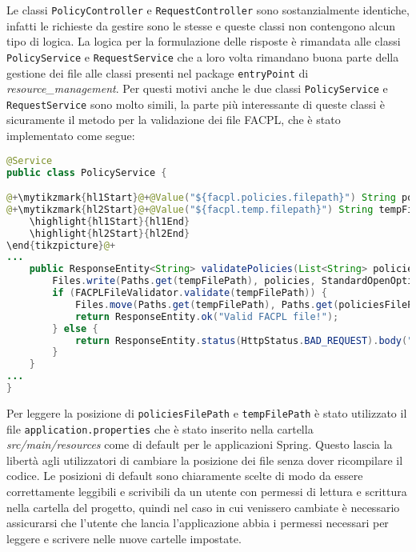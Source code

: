Le classi \texttt{PolicyController} e \texttt{RequestController} sono sostanzialmente identiche, infatti le richieste da gestire sono le stesse e queste classi non contengono alcun tipo di logica. La logica per la formulazione delle risposte è rimandata alle classi \texttt{PolicyService} e \texttt{RequestService} che a loro volta rimandano buona parte della gestione dei file alle classi presenti nel package \texttt{entryPoint} di \emph{resource\_management}.\medbreak
Per questi motivi anche le due classi \texttt{PolicyService} e \texttt{RequestService} sono molto simili, la parte più interessante di queste classi è sicuramente il metodo per la validazione dei file FACPL, che è stato implementato come segue:
\begin{lstlisting}[language=Java, caption=Metodo validatePolicies, label=code:PolicyServiceValidate, basicstyle=\fontsize{9}{11}\ttfamily]
@Service
public class PolicyService {

@+\mytikzmark{hl1Start}@+@Value("${facpl.policies.filepath}") String policiesFilePath;@+\mytikzmark{hl1End}@+
@+\mytikzmark{hl2Start}@+@Value("${facpl.temp.filepath}") String tempFilePath;@+\mytikzmark{hl2End}@+@+\begin{tikzpicture}[remember picture, overlay]
    \highlight{hl1Start}{hl1End}
    \highlight{hl2Start}{hl2End}
\end{tikzpicture}@+
...
    public ResponseEntity<String> validatePolicies(List<String> policies) throws IOException {
        Files.write(Paths.get(tempFilePath), policies, StandardOpenOption.CREATE, StandardOpenOption.TRUNCATE_EXISTING);
        if (FACPLFileValidator.validate(tempFilePath)) {
            Files.move(Paths.get(tempFilePath), Paths.get(policiesFilePath), StandardCopyOption.REPLACE_EXISTING);
            return ResponseEntity.ok("Valid FACPL file!");
        } else {
            return ResponseEntity.status(HttpStatus.BAD_REQUEST).body("Policy validation failed");
        }
    }
...
}
\end{lstlisting}
Per leggere la posizione di \texttt{policiesFilePath} e \texttt{tempFilePath} è stato utilizzato il file \texttt{application.properties} che è stato inserito nella cartella \emph{src/main/resources} come di default per le applicazioni Spring. Questo lascia la libertà agli utilizzatori di cambiare la posizione dei file senza dover ricompilare il codice. Le posizioni di default sono chiaramente scelte di modo da essere correttamente leggibili e scrivibili da un utente con permessi di lettura e scrittura nella cartella del progetto, quindi nel caso in cui venissero cambiate è necessario assicurarsi che l'utente che lancia l'applicazione abbia i permessi necessari per leggere e scrivere nelle nuove cartelle impostate.\break
